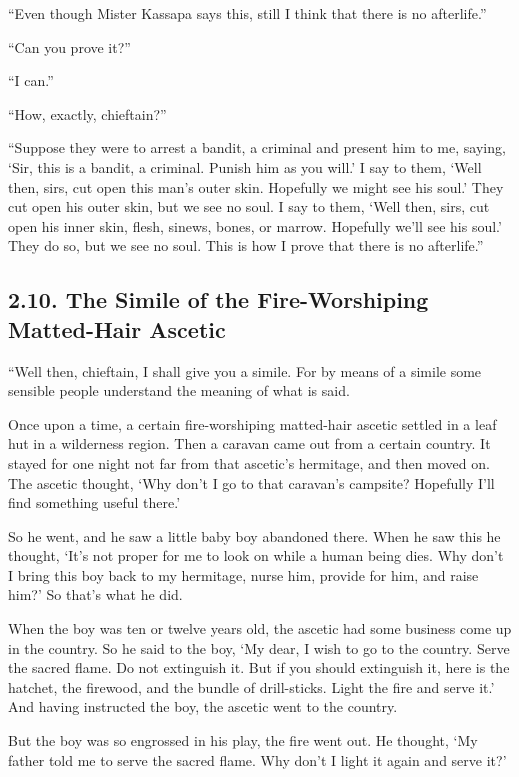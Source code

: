 \documentclass[12pt,openany]{book}%
\begin{document}
“Even though Mister Kassapa says this, still I think that there is no afterlife.” 

“Can you prove it?” 

“I can.” 

“How, exactly, chieftain?” 

“Suppose they were to arrest a bandit, a criminal and present him to me, saying, ‘Sir, this is a bandit, a criminal. Punish him as you will.’ I say to them, ‘Well then, sirs, cut open this man’s outer skin. Hopefully we might see his soul.’ They cut open his outer skin, but we see no soul. I say to them, ‘Well then, sirs, cut open his inner skin, flesh, sinews, bones, or marrow. Hopefully we’ll see his soul.’ They do so, but we see no soul. This is how I prove that there is no afterlife.” 

\subsection*{2.10. The Simile of the Fire-Worshiping Matted-Hair Ascetic }

“Well then, chieftain, I shall give you a simile. For by means of a simile some sensible people understand the meaning of what is said. 

Once upon a time, a certain fire-worshiping matted-hair ascetic settled in a leaf hut in a wilderness region. Then a caravan came out from a certain country. It stayed for one night not far from that ascetic’s hermitage, and then moved on. The ascetic thought, ‘Why don’t I go to that caravan’s campsite? Hopefully I’ll find something useful there.’ 

So he went, and he saw a little baby boy abandoned there. When he saw this he thought, ‘It’s not proper for me to look on while a human being dies. Why don’t I bring this boy back to my hermitage, nurse him, provide for him, and raise him?’ So that’s what he did. 

When the boy was ten or twelve years old, the ascetic had some business come up in the country. So he said to the boy, ‘My dear, I wish to go to the country. Serve the sacred flame. Do not extinguish it. But if you should extinguish it, here is the hatchet, the firewood, and the bundle of drill-sticks. Light the fire and serve it.’ And having instructed the boy, the ascetic went to the country. 

But the boy was so engrossed in his play, the fire went out. He thought, ‘My father told me to serve the sacred flame. Why don’t I light it again and serve it?’ 
\end{document}
